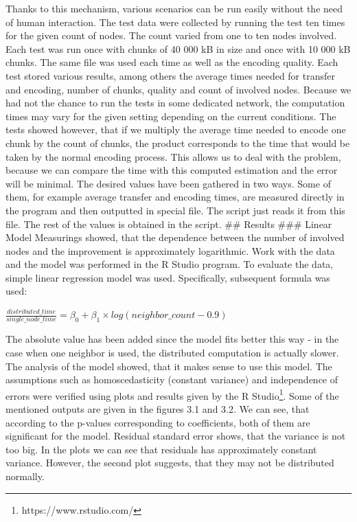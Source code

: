 Thanks to this mechanism, various scenarios can be run easily without
the need of human interaction. The test data were collected by running
the test ten times for the given count of nodes. The count varied from
one to ten nodes involved. Each test was run once with chunks of 40 000
kB in size and once with 10 000 kB chunks. The same file was used each
time as well as the encoding quality. Each test stored various results,
among others the average times needed for transfer and encoding, number
of chunks, quality and count of involved nodes. Because we had not the
chance to run the tests in some dedicated network, the computation times
may vary for the given setting depending on the current conditions. The
tests showed however, that if we multiply the average time needed to
encode one chunk by the count of chunks, the product corresponds to the
time that would be taken by the normal encoding process. This allows us
to deal with the problem, because we can compare the time with this
computed estimation and the error will be minimal. The desired values
have been gathered in two ways. Some of them, for example average
transfer and encoding times, are measured directly in the program and
then outputted in special file. The script just reads it from this file.
The rest of the values is obtained in the script. \#\# Results \#\#\#
Linear Model Measurings showed, that the dependence between the number
of involved nodes and the improvement is approximately logarithmic. Work
with the data and the model was performed in the R Studio program. To
evaluate the data, simple linear regression model was used.
Specifically, subsequent formula was used:

\begin{center}
$\frac{distributed\_time}{single\_node\_time} = \beta_0 + \beta_1 \times log(neighbor\_count - 0.9)$
\end{center}

The absolute value has been added since the model fits better this way -
in the case when one neighbor is used, the distributed computation is
actually slower. The analysis of the model showed, that it makes sense
to use this model. The assumptions such as homoscedasticity (constant
variance) and independence of errors were verified using plots and
results given by the R Studio\footnote{https://www.rstudio.com/}. Some
of the mentioned outputs are given in the figures 3.1 and 3.2. We can
see, that according to the p-values corresponding to coefficients, both
of them are significant for the model. Residual standard error shows,
that the variance is not too big. In the plots we can see that residuals
has approximately constant variance. However, the second plot suggests,
that they may not be distributed normally.

